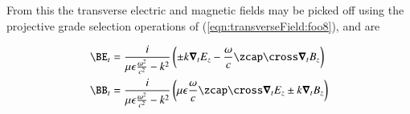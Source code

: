 From this the transverse electric and magnetic fields may be picked off using the projective grade selection operations of (\ref{eqn:transverseField:foo8}), and are

\begin{align}\label{eqn:transverseField:SummaryTransversePair}
\BE_t &= \frac{i}{\mu\epsilon\frac{\omega^2}{c^2} -k^2} \left( \pm k \spacegrad_t E_z - \frac{\omega}{c} \zcap \cross \spacegrad_t B_z \right) \\
\BB_t &= \frac{i}{\mu\epsilon\frac{\omega^2}{c^2} -k^2} \left( {\mu\epsilon}\frac{\omega}{c} \zcap \cross \spacegrad_t E_z \pm k \spacegrad_t B_z \right) 
\end{align}

\EndArticle
